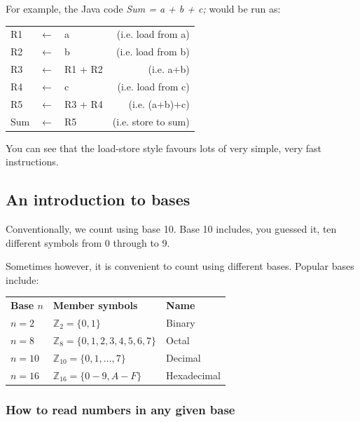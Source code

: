 For example, the Java code {\it Sum = a + b + c;} would be run as:

\begin{center}
    \begin{tabular}{l l l r}
        R1 & $\leftarrow$ & a & (i.e. load from a)\\
        R2 & $\leftarrow$ & b & (i.e. load from b)\\
        R3 & $\leftarrow$ & R1 + R2 & (i.e. a+b)\\
        R4 & $\leftarrow$ & c & (i.e. load from c)\\
        R5 & $\leftarrow$ & R3 + R4  & (i.e. (a+b)+c)\\
        Sum & $\leftarrow$ & R5 & (i.e. store to sum)\\
    \end{tabular}
\end{center}

You can see that the load-store style favours lots of very simple, very fast
instructions.

\subsection{An introduction to bases}

Conventionally, we count using base 10. Base 10 includes, you guessed it, ten
different symbols from 0 through to 9.

Sometimes however, it is convenient to count using different bases. Popular
bases include:

\begin{center}
	\begin{tabular}{l l l}
		{\bf Base $n$} & {\bf Member symbols} & {\bf Name}\\
		$n = 2$ & $\mathbb{Z}_2 = \{0, 1\}$ & Binary\\
		$n = 8$ & $\mathbb{Z}_8 = \{0, 1, 2, 3, 4, 5, 6, 7\}$ & Octal\\
		$n = 10$ & $\mathbb{Z}_{10} = \{0, 1, \ldots, 7\}$ & Decimal\\
		$n = 16$ & $\mathbb{Z}_{16} = \{0-9, A-F\}$ & Hexadecimal\\
	\end{tabular}
\end{center}

\subsubsection{How to read numbers in any given base}

